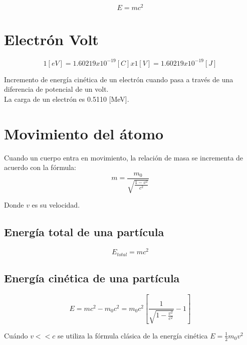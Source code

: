 \documentclass[]{article}
\begin{document}
\begin{equation}
E=mc^2
\end{equation}

\section{Electrón Volt}

\begin{equation}
1[eV]=1.60219x10^{-19}[C]x1[V]=1.60219x10^{-19}[J]
\end{equation}

Incremento de energía cinética de un
electrón cuando pasa a través de una diferencia de
potencial de un volt.\\

La carga de un electrón es 0.5110 [MeV].\\

\section{Movimiento del átomo}

Cuando un cuerpo entra en movimiento, la relación de
masa se incrementa de acuerdo con la fórmula:\\

\begin{equation}
 m=\frac{m_0}{\sqrt{\frac{1-v^2}{c^2}}}
\end{equation}

Donde $v$ es su velocidad.\\

\subsection{Energía total de una partícula}

\begin{equation}
   E_{total}=mc^2
\end{equation}

\subsection{Energía cinética de una partícula}

\begin{equation}
E=mc^2-m_0c^2=m_0c^2[\frac{1}{\sqrt{1-\frac{v^2}{c^2}}}-1]
\end{equation}

Cuándo $v<<c$ se utiliza la fórmula clásica de la energía cinética $E=\frac{1}{2}m_0v^2$
\end{document}
